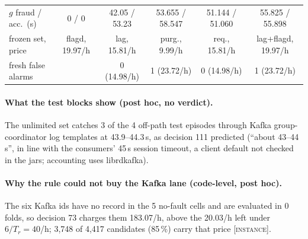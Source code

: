 \documentclass{ceurart}
\newcommand{\scope}[1]{\textsc{[#1]}}
\newcommand{\nv}{\textemdash}
\begin{document}
\begin{table}[t]
\begin{tabular}{@{}lrrrrrrrrrrr@{}}
$g$ fraud / acc.\ (s) & \multicolumn{3}{c}{0 / 0} & \multicolumn{2}{c}{42.05 / 53.23} & \multicolumn{2}{c}{53.655 / 58.547} & \multicolumn{2}{c}{51.144 / 51.060} & \multicolumn{2}{c}{55.825 / 55.898} \\
frozen set, price & \multicolumn{3}{c}{flagd, 19.97/h} & \multicolumn{2}{c}{lag, 15.81/h} & \multicolumn{2}{c}{purg., 9.99/h} & \multicolumn{2}{c}{req., 15.81/h} & \multicolumn{2}{c}{lag+flagd, 19.97/h} \\
fresh false alarms & \multicolumn{3}{c}{\nv} & \multicolumn{2}{c}{0 (14.98/h)} & \multicolumn{2}{c}{1 (23.72/h)} & \multicolumn{2}{c}{0 (14.98/h)} & \multicolumn{2}{c}{1 (23.72/h)} \\
\bottomrule
\end{tabular}
\end{table}

\paragraph{What the test blocks show (post hoc, no verdict).} The unlimited set catches 3 of the 4 off-path test
episodes through Kafka group-coordinator log templates at 43.9--44.3\,s, as decision 111 predicted (``about 43--44\,s'', in line
with the consumers' 45\,s session timeout, a client default not checked in the jars; accounting uses librdkafka). %

\paragraph{Why the rule could not buy the Kafka lane (code-level, post hoc).} The six Kafka ids have no record in
the 5 no-fault cells and are evaluated in 0 folds, so decision 73 charges them 183.07/h, above the
20.03/h left under $6/T_r = 40$/h; 3,748 of 4,417 candidates (85\,\%) carry that price \scope{instance}. %
\end{document}
